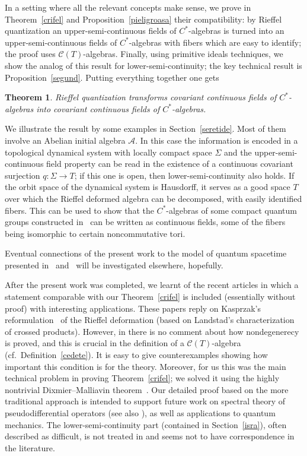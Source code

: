 \documentclass[pdftex]{sigma}
\def\A{{\mathcal A}}
\def\C{\mathcal{C}}
\def\Si{\Sigma}
\newtheorem{Theorem}{Theorem}[section]
\begin{document}
In a setting where all the relevant concepts make sense, we prove in Theorem~\ref{crifel} and Proposition~\ref{pieligroasa} their compatibility: by Rief\/fel quantization an upper-semi-continuous f\/ields of $C^*$-algebras
is turned into an upper-semi-continuous f\/ields of $C^*$-algebras with f\/ibers which are easy to identify; the proof
uses $\C(T)$-algebras. Finally, using primitive ideals techniques,
we show the analog of this result for lower-semi-continuity; the key technical result is Proposition~\ref{segund}.
Putting everything together one gets

\begin{Theorem}\label{mein}
Rieffel quantization transforms covariant continuous fields of $C^*$-algebras into
covariant continuous fields of $C^*$-algebras.
\end{Theorem}

We illustrate the result by some examples in Section~\ref{seretide}. Most of them involve an
Abelian initial algebra $\A$. In this case the information is encoded in a topological dynamical system
with locally compact space $\Si$ and the upper-semi-continuous f\/ield property can be read in the existence of a continuous
covariant surjection $q:\Si\rightarrow T$; if this one is open, then lower-semi-continuity also holds.
If the orbit space of the dynamical system is Hausdorf\/f, it serves as a good space $T$ over which the Rief\/fel
deformed algebra can be decomposed, with easily identif\/ied f\/ibers. This can be
used to show that the $C^*$-algebras of some
compact quantum groups constructed in~\cite{Rie3} can be written as continuous f\/ields, some of the f\/ibers being isomorphic
to certain noncommutative tori.

Eventual connections of the present work to the model of quantum spacetime presented in~\cite{DFR} and~\cite{Pi} will be investigated elsewhere, hopefully.

After the present work was completed, we learnt of the recent articles \cite{HM1,HM2} in which a statement comparable with our
Theorem~\ref{crifel} is included (essentially without proof) with interesting applications. These papers reply on Kasprzak's
reformulation~\cite{Ka} of the Rief\/fel deformation (based on Landstad's characterization of crossed products). However, in \cite{HM1,HM2} there is no comment about how nondegenerecy is proved, and this is crucial in the def\/inition of a $\mathcal C(T)$-algebra (cf.\ Def\/inition~\ref{cedete}). It is easy to give counterexamples showing how important this condition is for the theory. Moreover, for us this was the main technical problem in proving Theorem~\ref{crifel}; we solved it using the highly nontrivial Dixmier--Malliavin theorem~\cite{DM}. Our detailed proof
based on the more traditional approach is intended to support future work on spectral theory of pseudo\-dif\/ferential operators
(see also \cite{BM,Ma}), as well as applications to quantum mechanics.
The lower-semi-continuity part (contained in Section~\ref{isra}), often described as dif\/f\/icult, is not treated in \cite{HM1,HM2} and seems not to have
correspondence in the literature.
\end{document}
